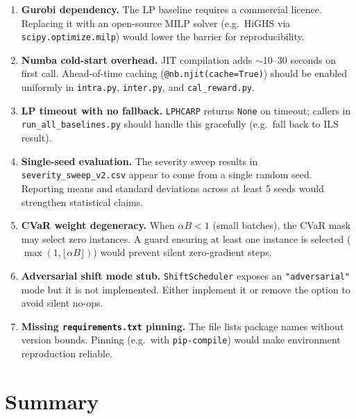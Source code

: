\documentclass[11pt,a4paper]{article}
\begin{document}
\begin{enumerate}

  \item \textbf{Gurobi dependency.}  The LP baseline requires a commercial
        licence. Replacing it with an open-source MILP solver (e.g.\ HiGHS via
        \texttt{scipy.optimize.milp}) would lower the barrier for reproducibility.

  \item \textbf{Numba cold-start overhead.}  JIT compilation adds $\sim$10--30
        seconds on first call. Ahead-of-time caching (\texttt{@nb.njit(cache=True)})
        should be enabled uniformly in \texttt{intra.py}, \texttt{inter.py}, and
        \texttt{cal\_reward.py}.

  \item \textbf{LP timeout with no fallback.}  \texttt{LPHCARP} returns
        \texttt{None} on timeout; callers in \texttt{run\_all\_baselines.py}
        should handle this gracefully (e.g.\ fall back to ILS result).

  \item \textbf{Single-seed evaluation.}  The severity sweep results in
        \texttt{severity\_sweep\_v2.csv} appear to come from a single random seed.
        Reporting means and standard deviations across at least 5 seeds would
        strengthen statistical claims.

  \item \textbf{CVaR weight degeneracy.}  When $\alpha B < 1$ (small batches),
        the CVaR mask may select zero instances. A guard ensuring at least one
        instance is selected ($\max(1, \lfloor\alpha B\rfloor)$) would prevent
        silent zero-gradient steps.

  \item \textbf{Adversarial shift mode stub.}  \texttt{ShiftScheduler} exposes an
        \texttt{"adversarial"} mode but it is not implemented. Either implement it
        or remove the option to avoid silent no-ops.

  \item \textbf{Missing \texttt{requirements.txt} pinning.}  The file lists
        package names without version bounds. Pinning (e.g.\ with
        \texttt{pip-compile}) would make environment reproduction reliable.

\end{enumerate}

\section{Summary}
\end{document}

